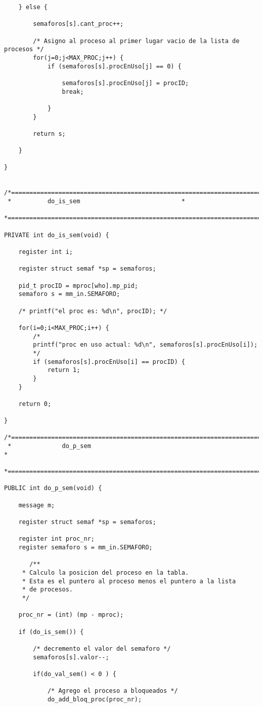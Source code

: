 \begin{verbatim}
	} else {

		semaforos[s].cant_proc++;

		/* Asigno al proceso al primer lugar vacio de la lista de procesos */
		for(j=0;j<MAX_PROC;j++) {
			if (semaforos[s].procEnUso[j] == 0) {

				semaforos[s].procEnUso[j] = procID;
				break;

			}
		}

		return s;

	}

}


/*===========================================================================*
 *			do_is_sem		    			     *
 *===========================================================================*/

PRIVATE int do_is_sem(void) {

	register int i;

	register struct semaf *sp = semaforos;

	pid_t procID = mproc[who].mp_pid;
	semaforo s = mm_in.SEMAFORO;

	/* printf("el proc es: %d\n", procID); */

	for(i=0;i<MAX_PROC;i++) {
		/*
		printf("proc en uso actual: %d\n", semaforos[s].procEnUso[i]);
		*/
		if (semaforos[s].procEnUso[i] == procID) {
			return 1;
		}
	}

	return 0;

}

/*===========================================================================*
 *				do_p_sem					     							 *
 *===========================================================================*/

PUBLIC int do_p_sem(void) {

	message m;

	register struct semaf *sp = semaforos;

	register int proc_nr;
	register semaforo s = mm_in.SEMAFORO;

       /**
	 * Calculo la posicion del proceso en la tabla.
	 * Esta es el puntero al proceso menos el puntero a la lista
	 * de procesos.
 	 */

	proc_nr = (int) (mp - mproc);

	if (do_is_sem()) {

		/* decremento el valor del semaforo */
		semaforos[s].valor--;

		if(do_val_sem() < 0 ) {

			/* Agrego el proceso a bloqueados */
			do_add_bloq_proc(proc_nr);


\end{verbatim}
